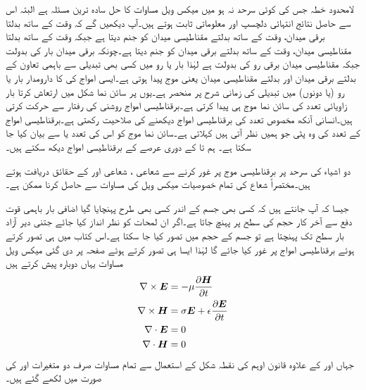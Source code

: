 لامحدود خطہ جس کی کوئی سرحد نہ ہو میں میکس ویل مساوات کا حل سادہ ترین مسئلہ ہے البتہ اس سے حاصل نتائج انتہائی دلچسپ اور معلوماتی ثابت ہوتے ہیں۔آپ دیکھیں گے کہ وقت کے ساتھ بدلتا برقی میدان، وقت کے ساتھ بدلتے مقناطیسی میدان کو جنم دیتا ہے جبکہ وقت کے ساتھ بدلتا مقناطیسی میدان، وقت کے ساتھ بدلتے برقی میدان کو جنم دیتا ہے۔چونکہ برقی میدان بار کی بدولت جبکہ مقناطیسی میدان برقی رو کی بدولت ہے لہٰذا بار یا رو میں کسی بھی تبدیلی سے  باہمی تعاون کے بدلتے برقی میدان اور بدلتے مقناطیسی میدان یعنی  موج پیدا ہوتی ہے۔ایسی امواج کی  کا دارومدار بار یا رو (یا دونوں) میں تبدیلی کی  زمانی شرح پر منحصر ہے۔یوں   پر سائن نما شکل میں ارتعاش کرتا بار  زاویائی تعدد کی سائن نما موج ہی پیدا کرتی ہے۔برقناطیسی امواج  روشنی کی رفتار سے حرکت کرتی ہیں۔انسانی آنکھ مخصوص تعدد کی برقناطیسی امواج دیکھنے کی صلاحیت رکھتی ہے۔برقناطیسی امواج کے تعدد کی وہ پٹی جو ہمیں نظر آتی ہیں  کہلاتی ہے۔سائن نما موج کو اس کی تعدد  یا   سے بیان کیا جا سکتا ہے۔ ہم  تا  کے دوری عرصے کے برقناطیسی امواج دیکھ سکتے ہیں۔

دو اشیاء کی سرحد پر برقناطیسی موج پر غور کرنے سے  شعاعی ، شعاعی  اور   کے حقائق دریافت ہوتے ہیں۔مختصراً شعاع کی تمام خصوصیات میکس ویل کی مساوات سے حاصل کرنا ممکن ہے۔

جیسا کہ آپ جانتے ہیں کہ کسی بھی جسم کے اندر کسی بھی طرح پہنچایا گیا اضافی بار باہمی قوت دفع سے آخر کار حجم کی سطح پر پہنچ جاتا ہے۔اگر ان لمحات کو نظر انداز کیا جائے جتنی دیر آزاد بار سطح تک پہنچتا ہے تو جسم کے حجم میں  تصور کیا جا سکتا ہے۔اس کتاب میں  ہی تصور کرتے ہوئے برقناطیسی امواج پر غور کیا جائے گا لہٰذا ایسا ہی تصور کرتے ہوئے صفحہ  پر دی گئی  میکس ویل مساوات یہاں دوبارہ پیش کرتے ہیں
\begin{align}
\nabla \times {\ensuremath{{\boldsymbol{E}}}}&=-\mu \frac{\partial {\ensuremath{{\boldsymbol{H}}}}}{\partial t}  \label{مساوات_موج_میکس_ویل_خالی_خلاء_الف}\\
\nabla \times {\ensuremath{{\boldsymbol{H}}}}&=\sigma {\ensuremath{{\boldsymbol{E}}}}+\epsilon \frac{\partial {\ensuremath{{\boldsymbol{E}}}}}{\partial t}  \label{مساوات_موج_میکس_ویل_خالی_خلاء_ب}\\
\nabla \cdot {\ensuremath{{\boldsymbol{E}}}}&=0 \label{مساوات_موج_میکس_ویل_خالی_خلاء_پ}\\
\nabla \cdot {\ensuremath{{\boldsymbol{H}}}}&=0  \label{مساوات_موج_میکس_ویل_خالی_خلاء_ت}
\end{align}
جہاں  اور  کے علاوہ قانون اوہم کی نقطہ شکل  کے  استعمال سے تمام مساوات صرف دو متغیرات  اور  کی صورت میں لکھے گئے ہیں۔

